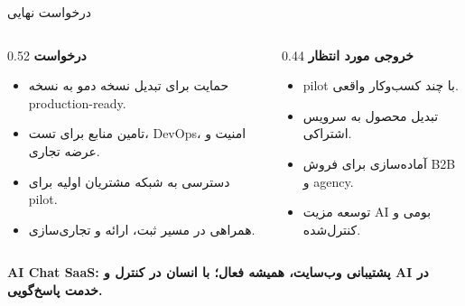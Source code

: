 \documentclass[aspectratio=169,12pt]{beamer}
\begin{document}
\begin{frame}{درخواست نهایی}
  \begin{columns}[T,totalwidth=\textwidth]
    \begin{column}{0.52\textwidth}
      \textbf{درخواست}
      \begin{itemize}
        \item حمایت برای تبدیل نسخه دمو به نسخه production-ready.
        \item تامین منابع برای تست، DevOps، امنیت و عرضه تجاری.
        \item دسترسی به شبکه مشتریان اولیه برای pilot.
        \item همراهی در مسیر ثبت، ارائه و تجاری‌سازی.
      \end{itemize}
    \end{column}
    \begin{column}{0.44\textwidth}
      \textbf{خروجی مورد انتظار}
      \begin{itemize}
        \item pilot با چند کسب‌وکار واقعی.
        \item تبدیل محصول به سرویس اشتراکی.
        \item آماده‌سازی برای فروش B2B و agency.
        \item توسعه مزیت AI بومی و کنترل‌شده.
      \end{itemize}
    \end{column}
  \end{columns}

  \vspace{7mm}
  \begin{center}
    {\Large\bfseries\color{primary} AI Chat SaaS: پشتیبانی وب‌سایت، همیشه فعال؛ با انسان در کنترل و AI در خدمت پاسخ‌گویی.}
  \end{center}
\end{frame}
\end{document}
